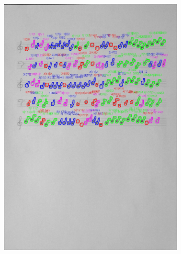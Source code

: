 \documentclass[11pt]{article}
\begin{document}
\begin{figure}[H]
\begin{subfigure}{.45\textwidth}
        \includegraphics[width=\linewidth]{23_cnts.jpg}
        \label{fig:sub2}
    \end{subfigure}
    \label{fig:test}
\end{figure}
\end{document}
